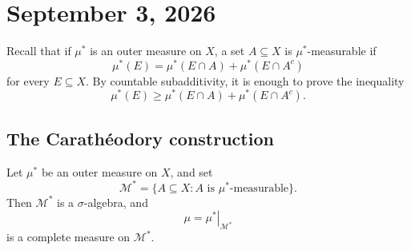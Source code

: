 \section{September 3, 2026}

Recall that if $\mu^*$ is an outer measure on $X$, a set $A\subseteq X$
is $\mu^*$-measurable if
\[
  \mu^*(E)=\mu^*(E\cap A)+\mu^*(E\cap A^c)
\]
for every $E\subseteq X$. By countable subadditivity, it is enough to
prove the inequality
\[
  \mu^*(E)\geq\mu^*(E\cap A)+\mu^*(E\cap A^c).
\]

\subsection{The Carath\'eodory construction}

\begin{theorem}\label{thm:caratheodory}
  Let $\mu^*$ be an outer measure on $X$, and set
  \[
    \mathcal M^*
    =\{A\subseteq X:A\text{ is $\mu^*$-measurable}\}.
  \]
  Then $\mathcal M^*$ is a $\sigma$-algebra, and
  \[
    \mu=\left.\mu^*\right|_{\mathcal M^*}
  \]
  is a complete measure on $\mathcal M^*$.
\end{theorem}


